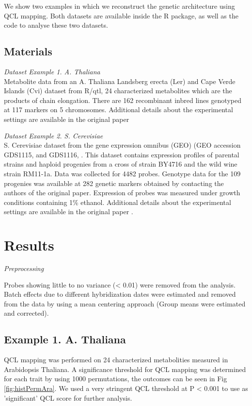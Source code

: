 \documentclass[12pt]{article}
\begin{document}
  We show two examples in which we reconstruct the genetic architecture using QCL mapping. 
  Both datasets are available inside the R package, as well as the code to analyse these 
  two datasets.

\subsection*{Materials}
\emph{\sffamily Dataset Example 1. A. Thaliana}\\
  Metabolite data from an A. Thaliana Landsberg erecta (Ler) and Cape Verde Islands (Cvi) 
  dataset from R/qtl, 24 characterized metabolites which are the products of chain elongation. 
  There are 162	recombinant inbred lines genotyped at 117 markers on 5 chromosomes. Additional 
  details about the experimental settings are available in the original paper \cite{Keurentjes:2006,AlonsoBlanco:1998}

\emph{\sffamily Dataset Example 2. S. Cerevisiae}\\
  S. Cerevisiae dataset from the gene expression omnibus (GEO) \cite{Edgar:2002} (GEO 
  accession GDS1115, and GDS1116, \cite{Brem:2005}. This dataset contains expression 
  profiles of parental strains and haploid progenies from a cross of strain BY4716 and 
  the wild wine strain RM11-1a. Data was collected for 4482 probes. Genotype data 
  for the 109 progenies was available at 282 genetic markers obtained by contacting 
  the authors of the original paper. 
  Expression of probes was measured under growth conditions containing 1\% ethanol. 
  Additional details about the experimental settings are available in the original 
  paper \cite{Brem:2005}.

\bigskip
\section*{Results}
\emph{\sffamily Preprocessing}

  Probes showing little to no variance (< 0.01) were removed from the analysis. Batch 
  effects due to different hybridization dates were estimated and removed from the data 
  by using a mean centering approach (Group means were estimated and corrected).

\nopagebreak

  \subsection{Example 1. A. Thaliana}
  QCL mapping was performed on 24 characterized metabolities measured in Arabidopsis 
  Thaliana. A significance threshold for QCL mapping was determined for each trait 
  by using 1000 permutations, the outcomes can be seen in Fig \ref{fig:histPermAra}. 
  We used a very stringent QCL threshold at P < 0.001 to use as 'significant' QCL 
  score for further analysis. 
  
\end{document}

